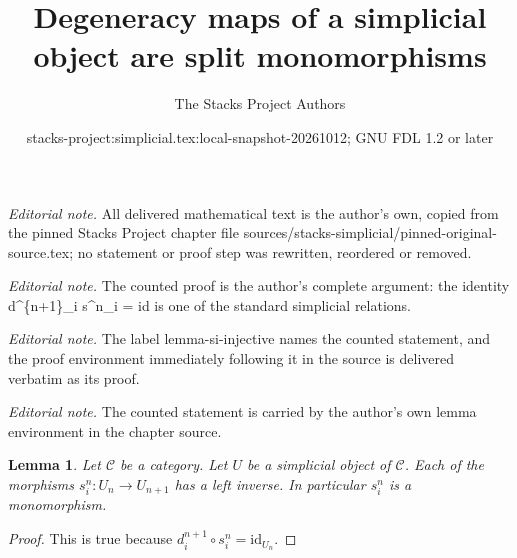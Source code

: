 \documentclass{stacks-project}
\title{Degeneracy maps of a simplicial object are split monomorphisms}
\author{The Stacks Project Authors}
\date{stacks-project:simplicial.tex:local-snapshot-20261012; GNU FDL 1.2 or later}
\theoremstyle{plain}
\newtheorem{lemma}[subsection]{Lemma}
\theoremstyle{definition}
\theoremstyle{remark}
\numberwithin{equation}{subsection}
\begin{document}
\maketitle
\noindent\textit{Editorial note.} All delivered mathematical text is the author's own, copied from the pinned Stacks Project chapter file sources/stacks-simplicial/pinned-original-source.tex; no statement or proof step was rewritten, reordered or removed.\par\medskip
\noindent\textit{Editorial note.} The counted proof is the author's complete argument: the identity d\textasciicircum{}\{n+1\}\_i s\textasciicircum{}n\_i = id is one of the standard simplicial relations.\par\medskip
\noindent\textit{Editorial note.} The label lemma-si-injective names the counted statement, and the proof environment immediately following it in the source is delivered verbatim as its proof.\par\medskip
\noindent\textit{Editorial note.} The counted statement is carried by the author's own lemma environment in the chapter source.\par\medskip
\begin{lemma}
\label{lemma-si-injective}
Let $\mathcal{C}$ be a category.
Let $U$ be a simplicial object of $\mathcal{C}$.
Each of the morphisms $s^n_i : U_n \to U_{n + 1}$
has a left inverse. In particular $s^n_i$ is a monomorphism.
\end{lemma}

\begin{proof}
This is true because $d_i^{n + 1} \circ s^n_i = \text{id}_{U_n}$.
\end{proof}
\end{document}
